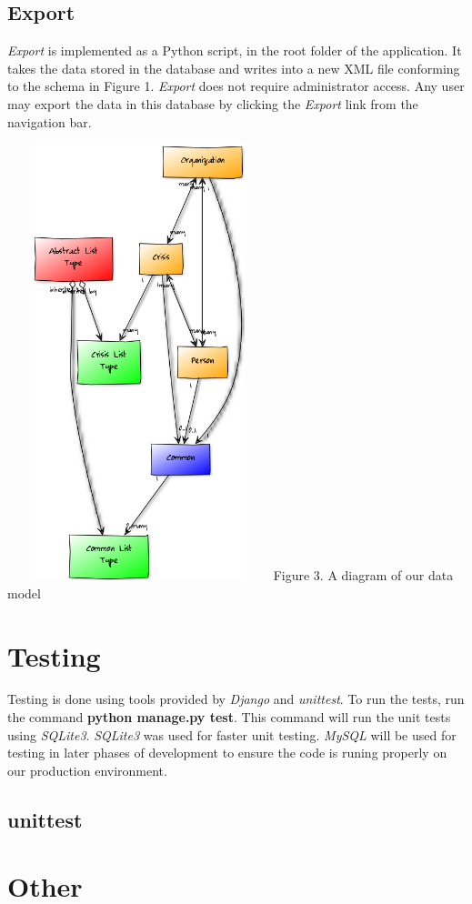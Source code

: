 \documentclass[12pt]{report}
\begin{document}
\subsection*{Export}
\emph{Export} is implemented as a Python script, in the root folder of the application.
It takes the data stored in the database and writes into a new XML file conforming to the schema in Figure 1.
\emph{Export} does not require administrator access.
Any user may export the data in this database by clicking the \emph{Export} link from the navigation bar.

\hfill \newline \newline
\includegraphics*[width=3in,height=5in]{dataModelDiagram.png}
\newline
\footnotesize
Figure 3. A diagram of our data model %
\normalsize
\newpage

\newpage
\section*{Testing}
Testing is done using tools provided by \emph{Django} and \emph{unittest}.
To run the tests, run the command \textbf{python manage.py test}.
This command will run the unit tests using \emph{SQLite3}.
\emph{SQLite3} was used for faster unit testing.
\emph{MySQL} will be used for testing in later phases of development to ensure the code is runing properly on our production environment.

\subsection*{unittest}


\newpage
\section*{Other}
\end{document}
